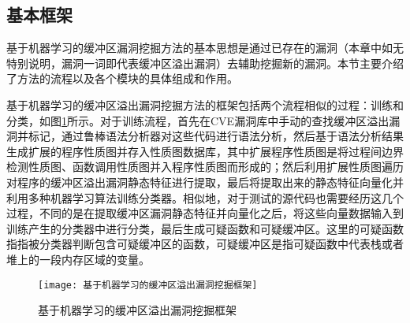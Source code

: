 {%

\subsection{基本框架}

基于机器学习的缓冲区漏洞挖掘方法的基本思想是通过已存在的漏洞{（本章中如无特别说明，漏洞一词即代表缓冲区溢出漏洞）}去辅助挖掘新的漏洞。本节主要介绍了方法的流程以及各个模块的具体组成和作用。

基于机器学习的缓冲区溢出漏洞挖掘方法的框架包括两个流程相似的过程：训练和分类，如图\ref{fig:基于机器学习的缓冲区溢出漏洞挖掘框架}所示。对于训练流程，首先在CVE漏洞库中手动的查找缓冲区溢出漏洞并标记，通过鲁棒语法分析器对这些代码进行语法分析，然后基于语法分析结果生成扩展的程序性质图并存入性质图数据库，其中扩展程序性质图是将过程间边界检测性质图、函数调用性质图并入程序性质图而形成的；然后利用扩展性质图遍历对程序的缓冲区溢出漏洞静态特征进行提取，最后将提取出来的静态特征向量化并利用多种机器学习算法训练分类器。相似地，对于测试的源代码也需要经历这几个过程，不同的是在提取缓冲区漏洞静态特征并向量化之后，将这些向量数据输入到训练产生的分类器中进行分类，最后生成可疑函数和可疑缓冲区。这里的可疑函数指指被分类器判断包含可疑缓冲区的函数，可疑缓冲区是指可疑函数中代表栈或者堆上的一段内存区域的变量。

\begin{figure}[htp]
\centering
\texttt{[image: 基于机器学习的缓冲区溢出漏洞挖掘框架]}
\caption{基于机器学习的缓冲区溢出漏洞挖掘框架}
\label{fig:基于机器学习的缓冲区溢出漏洞挖掘框架}
\end{figure}

}
